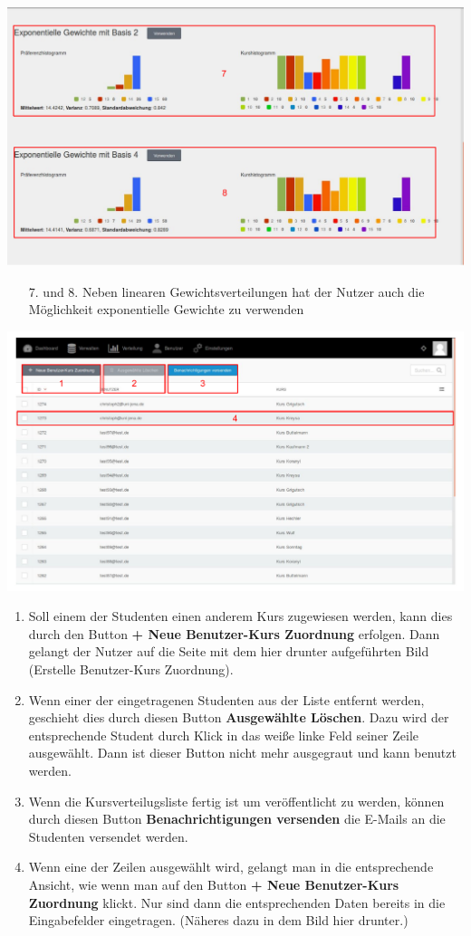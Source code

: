   \includegraphics[scale=0.3]{backend/img/distribution_3.pdf}
  \begin{enumerate}
   \item[7. und 8.] Neben linearen Gewichtsverteilungen hat der Nutzer auch die Möglichkeit exponentielle Gewichte zu verwenden
  \end{enumerate}

  \includegraphics[scale=0.3]{backend/img/distribution_4.pdf}
  \begin{enumerate}
   \item Soll einem der Studenten einen anderem Kurs zugewiesen werden, kann dies durch den Button \textbf{+ Neue Benutzer-Kurs Zuordnung} erfolgen.
	 Dann gelangt der Nutzer auf die Seite mit dem hier drunter aufgeführten Bild (Erstelle Benutzer-Kurs Zuordnung).
   \item Wenn einer der eingetragenen Studenten aus der Liste entfernt werden, geschieht dies durch diesen Button \textbf{Ausgewählte Löschen}.
	 Dazu wird der entsprechende Student durch Klick in das weiße linke Feld seiner Zeile ausgewählt.
	 Dann ist dieser Button nicht mehr ausgegraut und kann benutzt werden.
   \item Wenn die Kursverteilugsliste fertig ist um veröffentlicht zu werden, 
	 können durch diesen Button \textbf{Benachrichtigungen versenden} die E-Mails an die Studenten versendet werden.
   \item Wenn eine der Zeilen ausgewählt wird, gelangt man in die entsprechende Ansicht, wie wenn man auf den Button \textbf{+ Neue Benutzer-Kurs Zuordnung} klickt.
	 Nur sind dann die entsprechenden Daten bereits in die Eingabefelder eingetragen. (Näheres dazu in dem Bild hier drunter.)
  \end{enumerate}

